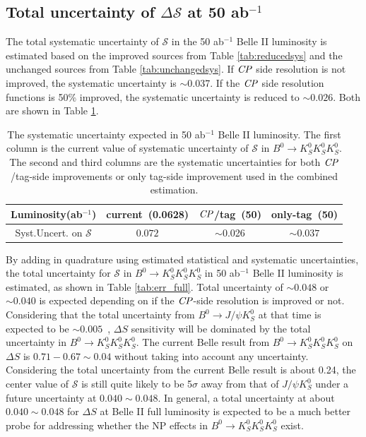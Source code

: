 \subsection{Total uncertainty of $\Delta \mathcal{S}$ at 50 ab$^{-1}$}
The total systematic uncertainty of $\mathcal{S}$ in the 50 ab$^{-1}$ Belle II luminosity is estimated based on the improved sources from Table \ref{tab:reducedsys} and the unchanged sources from Table \ref{tab:unchangedsys}. If $\it{CP}$ side resolution is not improved, the systematic uncertainty is $\sim$0.037. If the $\it{CP}$ side resolution functions is 50\% improved, the systematic uncertainty is reduced to  $\sim0.026$. Both are shown in Table \ref{tab:sys_full}.
\begin{table}[htpb]
	\centering
	\caption{The systematic uncertainty expected in 50 ab$^{-1}$ Belle II luminosity. The first column is the current value of systematic uncertainty of $\mathcal{S}$ in $B^0 \to K_S^0  K_S^0  K_S^0$. The second and third columns are the systematic uncertainties for both $\it{CP}$/tag-side improvements or only tag-side improvement used in the combined estimation.}
	\label{tab:sys_full}
	\begin{tabular}{c| c | c |c}
		\hline
		Luminosity(ab$^{-1}$) & current~(0.0628) & $\it{CP}$/tag~(50)& only-tag~(50)\\
		\hline
		Syst.Uncert. on $\mathcal{S}$ & $0.072$ & $\sim$0.026 & $\sim0.037$\\
		\hline
	\end{tabular}
\end{table}


By adding in quadrature using estimated statistical and systematic uncertainties, the total uncertainty for $\mathcal{S}$ in $B^0 \to K_S^0  K_S^0  K_S^0$ in 50 ab$^{-1}$ Belle II luminosity is estimated, as shown in Table \ref{tab:err_full}. Total uncertainty of $\sim 0.048$ or $\sim 0.040$ is expected depending on if the $\it{CP}$-side resolution is improved or not. Considering that the total uncertainty from $B^0\to J/\psi K_S^0$ at that time is expected to be $\sim 0.005$~\cite{b2book}, $\Delta S$ sensitivity  will be dominated by the total uncertainty in $B^0 \to K_S^0  K_S^0  K_S^0$. The current Belle result from $B^0 \to K_S^0  K_S^0  K_S^0$ on $\Delta S$ is $0.71-0.67\sim0.04$ without taking into account any uncertainty. Considering the total uncertainty from the current Belle result is about 0.24, the center value of $\mathcal{S}$ is still quite likely to be 5$\sigma$ away from that of $J/\psi K^0_S$ under a future uncertainty at $0.040\sim 0.048$.
In general, a total uncertainty at about $0.040\sim 0.048$ for $\Delta S$ at Belle II full luminosity is expected to be a much better probe for addressing whether the NP effects in $B^0 \to K_S^0  K_S^0  K_S^0$ exist. 

